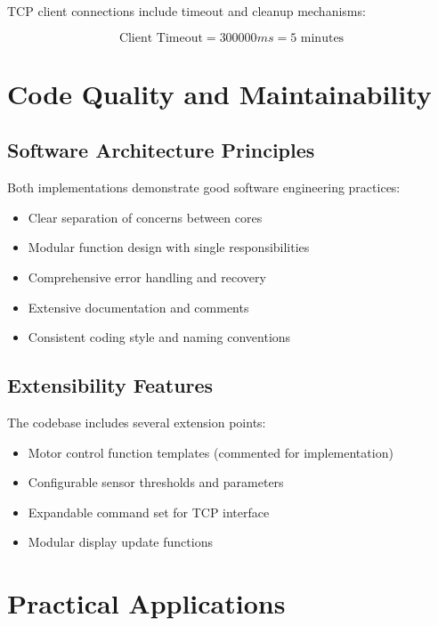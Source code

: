 \documentclass[12pt,a4paper]{article}
\begin{document}
TCP client connections include timeout and cleanup mechanisms:

\begin{equation}
\text{Client Timeout} = 300000ms = 5 \text{ minutes}
\end{equation}

\section{Code Quality and Maintainability}

\subsection{Software Architecture Principles}

Both implementations demonstrate good software engineering practices:

\begin{itemize}
    \item Clear separation of concerns between cores
    \item Modular function design with single responsibilities
    \item Comprehensive error handling and recovery
    \item Extensive documentation and comments
    \item Consistent coding style and naming conventions
\end{itemize}

\subsection{Extensibility Features}

The codebase includes several extension points:

\begin{itemize}
    \item Motor control function templates (commented for implementation)
    \item Configurable sensor thresholds and parameters
    \item Expandable command set for TCP interface
    \item Modular display update functions
\end{itemize}

\section{Practical Applications}
\end{document}
